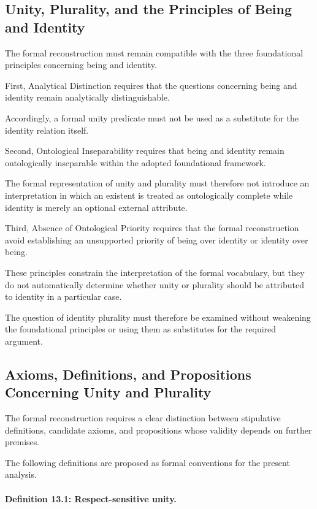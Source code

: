 \subsection{Unity, Plurality, and the Principles of Being and Identity}

The formal reconstruction must
remain compatible with the three
foundational principles concerning
being and identity.

First, Analytical Distinction
requires that the questions
concerning being and identity
remain analytically distinguishable.

Accordingly, a formal unity
predicate must not be used as
a substitute for the identity
relation itself.

Second, Ontological Inseparability
requires that being and identity
remain ontologically inseparable
within the adopted foundational
framework.

The formal representation of
unity and plurality must therefore
not introduce an interpretation
in which an existent is treated
as ontologically complete while
identity is merely an optional
external attribute.

Third, Absence of Ontological
Priority requires that the
formal reconstruction avoid
establishing an unsupported
priority of being over identity
or identity over being.

These principles constrain the
interpretation of the formal
vocabulary, but they do not
automatically determine whether
unity or plurality should be
attributed to identity in a
particular case.

The question of identity plurality
must therefore be examined
without weakening the foundational
principles or using them as
substitutes for the required
argument.

\subsection{Axioms, Definitions, and Propositions Concerning Unity and Plurality}

The formal reconstruction requires
a clear distinction between
stipulative definitions, candidate
axioms, and propositions whose
validity depends on further
premises.

The following definitions are
proposed as formal conventions
for the present analysis.

\paragraph{Definition 13.1: Respect-sensitive unity.}

